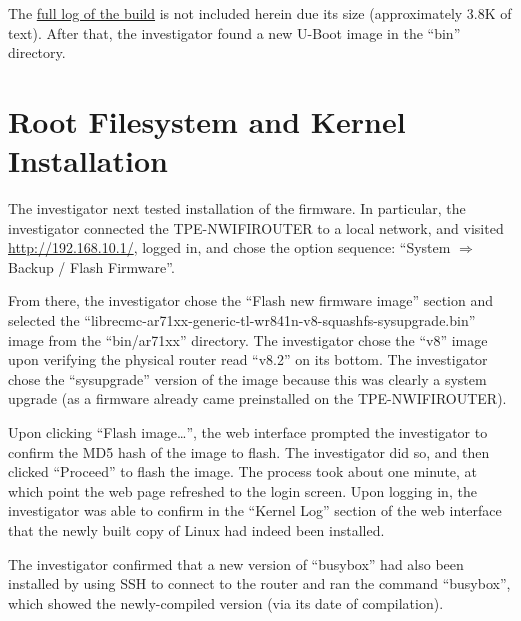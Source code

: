 The
\href{https://gitorious.org/copyleft-org/tutorial/source/master:enforcement-case-studies_log-output/thinkpenguin_u-boot-finish_build.log}{full
  log of the build} is not included herein due its size (approximately 3.8K
of text).  After that, the investigator found a new U-Boot image in the
``bin'' directory.

\section{Root Filesystem and Kernel Installation}

The investigator next tested installation of the firmware.  In particular,
the investigator connected the TPE-NWIFIROUTER to a local network, and
visited \url{http://192.168.10.1/}, logged in, and chose the option sequence:
``System $\Rightarrow$ Backup / Flash Firmware''.

From there, the investigator chose the ``Flash new firmware image'' section
and selected the
``librecmc-ar71xx-generic-tl-wr841n-v8-squashfs-sysupgrade.bin'' image from
the ``bin/ar71xx'' directory.  The investigator chose the ``v8'' image upon
verifying the physical router read ``v8.2'' on its bottom.  The investigator
chose the ``sysupgrade'' version of the image because this was clearly a
system upgrade (as a firmware already came preinstalled on the
TPE-NWIFIROUTER).

Upon clicking ``Flash image\ldots'', the web interface prompted the
investigator to confirm the MD5 hash of the image to flash.  The investigator
did so, and then clicked ``Proceed'' to flash the image.  The process took
about one minute, at which point the web page refreshed to the login screen.
Upon logging in, the investigator was able to confirm in the ``Kernel Log''
section of the web interface that the newly built copy of Linux had indeed been
installed.

The investigator confirmed that a new version of ``busybox'' had also been
installed by using SSH to connect to the router and ran the command
``busybox'', which showed the newly-compiled version (via its date of
compilation).


